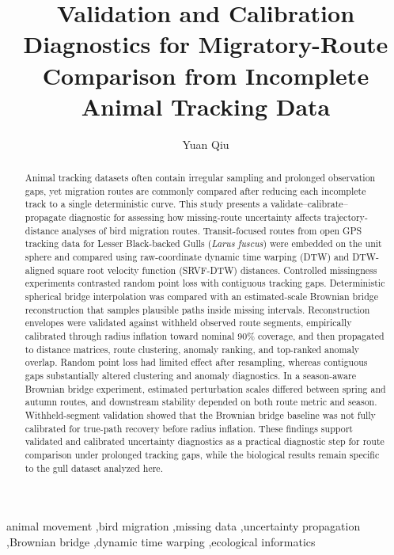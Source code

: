 \documentclass[preprint,12pt,authoryear]{elsarticle}
\begin{document}
\begin{frontmatter}

\title{Validation and Calibration Diagnostics for Migratory-Route Comparison from Incomplete Animal Tracking Data}

\author[hdu]{Yuan Qiu}



\begin{abstract}
Animal tracking datasets often contain irregular sampling and prolonged observation gaps, yet migration routes are commonly compared after reducing each incomplete track to a single deterministic curve. This study presents a validate--calibrate--propagate diagnostic for assessing how missing-route uncertainty affects trajectory-distance analyses of bird migration routes. Transit-focused routes from open GPS tracking data for Lesser Black-backed Gulls (\emph{Larus fuscus}) were embedded on the unit sphere and compared using raw-coordinate dynamic time warping (DTW) and DTW-aligned square root velocity function (SRVF-DTW) distances. Controlled missingness experiments contrasted random point loss with contiguous tracking gaps. Deterministic spherical bridge interpolation was compared with an estimated-scale Brownian bridge reconstruction that samples plausible paths inside missing intervals. Reconstruction envelopes were validated against withheld observed route segments, empirically calibrated through radius inflation toward nominal 90\% coverage, and then propagated to distance matrices, route clustering, anomaly ranking, and top-ranked anomaly overlap. Random point loss had limited effect after resampling, whereas contiguous gaps substantially altered clustering and anomaly diagnostics. In a season-aware Brownian bridge experiment, estimated perturbation scales differed between spring and autumn routes, and downstream stability depended on both route metric and season. Withheld-segment validation showed that the Brownian bridge baseline was not fully calibrated for true-path recovery before radius inflation. These findings support validated and calibrated uncertainty diagnostics as a practical diagnostic step for route comparison under prolonged tracking gaps, while the biological results remain specific to the gull dataset analyzed here.
\end{abstract}

\begin{keyword}
animal movement \sep bird migration \sep missing data \sep uncertainty propagation \sep Brownian bridge \sep dynamic time warping \sep ecological informatics
\end{keyword}

\end{frontmatter}
\end{document}
